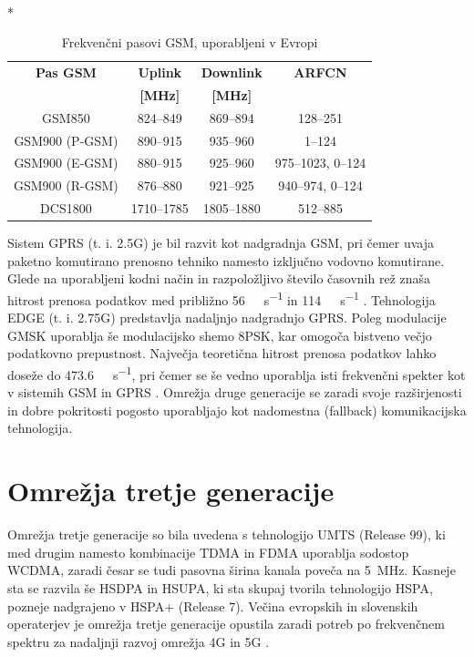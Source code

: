 \documentclass[a4paper,twoside,openright,12pt,slovene]{book}
\begin{document}
\begin{footnotesize}
\begin{table}[H]
    \centering
    \caption{\label{tab:gsm_bands} Frekvenčni pasovi GSM, uporabljeni v Evropi}
    ~\\*
    \begin{tabular}{cccc}
        \hline
        \rule{0pt}{3ex}
        \textbf{Pas GSM} &
        \textbf{Uplink} &
        \textbf{Downlink} &
        \textbf{ARFCN} \\
        \textbf{} &
        \textbf{[MHz]} &
        \textbf{[MHz]} &
        \textbf{} \\[0.5ex]
        \hline
        GSM850         & 824--849   & 869--894   & 128--251 \\
        GSM900 (P-GSM) & 890--915   & 935--960   & 1--124 \\
        GSM900 (E-GSM) & 880--915   & 925--960   & 975--1023, 0--124 \\
        GSM900 (R-GSM) & 876--880   & 921--925   & 940--974, 0--124 \\
        DCS1800        & 1710--1785 & 1805--1880 & 512--885 \\
        \hline
    \end{tabular}
\end{table}
\end{footnotesize}

Sistem GPRS (t. i. 2.5G) je bil razvit kot nadgradnja GSM, pri čemer uvaja paketno komutirano prenosno tehniko namesto izključno vodovno komutirane. Glede na uporabljeni kodni način in razpoložljivo število časovnih rež znaša hitrost prenosa podatkov med približno \SI{56}{\kilo\bit\per\second} in \SI{114}{\kilo\bit\per\second} \cite{ETSI_TS_101_350}.
\newpage
Tehnologija EDGE (t. i. 2.75G) predstavlja nadaljnjo nadgradnjo GPRS. Poleg modulacije GMSK uporablja še modulacijsko shemo 8PSK, kar omogoča bistveno večjo podatkovno prepustnost. Največja teoretična hitrost prenosa podatkov lahko doseže do \SI{473,6}{\kilo\bit\per\second}, pri čemer se še vedno uporablja isti frekvenčni spekter kot v sistemih GSM in GPRS \cite{GPRS}. Omrežja druge generacije se zaradi svoje razširjenosti in dobre pokritosti pogosto uporabljajo kot nadomestna (fallback) komunikacijska tehnologija. 
\section{Omrežja tretje generacije} \label{sec:3g}
    Omrežja tretje generacije so bila uvedena s tehnologijo UMTS (Release 99), ki med drugim namesto kombinacije TDMA in FDMA uporablja sodostop WCDMA, zaradi česar se tudi pasovna širina kanala poveča na \SI{5}{\mega\hertz}. Kasneje sta se razvila še HSDPA in HSUPA, ki sta skupaj tvorila tehnologijo HSPA, pozneje nadgrajeno v HSPA+ (Release 7). Večina evropskih in slovenskih operaterjev je omrežja tretje generacije opustila zaradi potreb po frekvenčnem spektru za nadaljnji razvoj omrežja 4G in 5G \cite{3Gupokojitev}.
    
\end{document}
